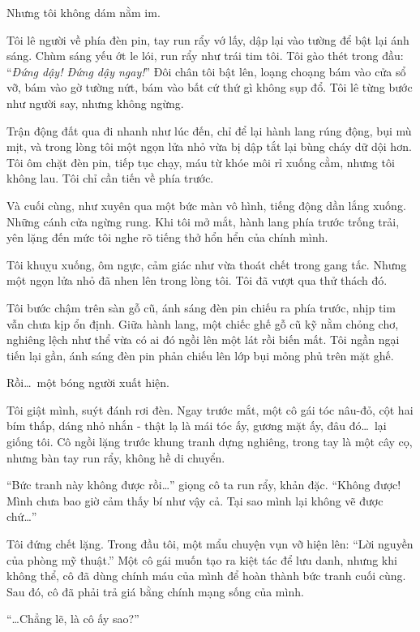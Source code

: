 \documentclass[../main.tex]{subfiles}
\begin{document}
Nhưng tôi không dám nằm im.

Tôi lê người về phía đèn pin, tay run rẩy vớ lấy, dập lại vào tường để bật lại ánh sáng. Chùm sáng yếu ớt le lói, run rẩy như trái tim tôi. Tôi gào thét trong đầu: ``\textit{Đứng dậy! Đứng dậy ngay!}'' Đôi chân tôi bật lên, loạng choạng bám vào cửa sổ vỡ, bám vào gờ tường nứt, bám vào bất cứ thứ gì không sụp đổ. Tôi lê từng bước như người say, nhưng không ngừng.

Trận động đất qua đi nhanh như lúc đến, chỉ để lại hành lang rúng động, bụi mù mịt, và trong lòng tôi một ngọn lửa nhỏ vừa bị dập tắt lại bùng cháy dữ dội hơn. Tôi ôm chặt đèn pin, tiếp tục chạy, máu từ khóe môi rỉ xuống cằm, nhưng tôi không lau. Tôi chỉ cần tiến về phía trước.

Và cuối cùng, như xuyên qua một bức màn vô hình, tiếng động dần lắng xuống. Những cánh cửa ngừng rung. Khi tôi mở mắt, hành lang phía trước trống trải, yên lặng đến mức tôi nghe rõ tiếng thở hổn hển của chính mình.

Tôi khuỵu xuống, ôm ngực, cảm giác như vừa thoát chết trong gang tấc. Nhưng một ngọn lửa nhỏ đã nhen lên trong lòng tôi. Tôi đã vượt qua thử thách đó.

\ct

Tôi bước chậm trên sàn gỗ cũ, ánh sáng đèn pin chiếu ra phía trước, nhịp tim vẫn chưa kịp ổn định. Giữa hành lang, một chiếc ghế gỗ cũ kỹ nằm chỏng chơ, nghiêng lệch như thể vừa có ai đó ngồi lên một lát rồi biến mất. Tôi ngần ngại tiến lại gần, ánh sáng đèn pin phản chiếu lên lớp bụi mỏng phủ trên mặt ghế.

Rồi\dots\ một bóng người xuất hiện.

Tôi giật mình, suýt đánh rơi đèn. Ngay trước mắt, một cô gái tóc nâu-đỏ, cột hai bím thấp, dáng nhỏ nhắn - thật lạ là mái tóc ấy, gương mặt ấy, đâu đó\dots\ lại giống tôi. Cô ngồi lặng trước khung tranh dựng nghiêng, trong tay là một cây cọ, nhưng bàn tay run rẩy, không hề di chuyển.

``Bức tranh này không được rồi\dots''
giọng cô ta run rẩy, khản đặc. ``Không được! Mình chưa bao giờ cảm thấy bí như vậy cả. Tại sao mình lại không vẽ được chứ\dots''

Tôi đứng chết lặng. Trong đầu tôi, một mẩu chuyện vụn vỡ hiện lên: ``Lời nguyền của phòng mỹ thuật.'' Một cô gái muốn tạo ra kiệt tác để lưu danh, nhưng khi không thể, cô đã dùng chính máu của mình để hoàn thành bức tranh cuối cùng. Sau đó, cô đã phải trả giá bằng chính mạng sống của mình.

``\dots Chẳng lẽ, là cô ấy sao?''
\end{document}
